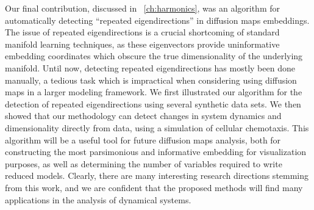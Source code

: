 Our final contribution, discussed in \chap~\ref{ch:harmonics}, was an algorithm for automatically detecting ``repeated eigendirections'' in diffusion maps embeddings.
%
The issue of repeated eigendirections is a crucial shortcoming of standard manifold learning techniques, as these eigenvectors provide uninformative embedding coordinates which obscure the true dimensionality of the underlying manifold.
%
Until now, detecting repeated eigendirections has mostly been done manually, a tedious task which is impractical when considering using diffusion maps in a larger modeling framework.
%
We first illustrated our algorithm for the detection of repeated eigendirections using several synthetic data sets. 
%
We then showed that our methodology can detect changes in system dynamics and dimensionality directly from data, using a simulation of cellular chemotaxis.
%
This algorithm will be a useful tool for future diffusion maps analysis, both for constructing the most parsimonious and informative embedding for visualization purposes, as well as determining the number of variables required to write reduced models.
%
Clearly, there are many interesting research directions stemming from this work, and we are confident that the proposed methods will find many applications in the analysis of dynamical systems.

